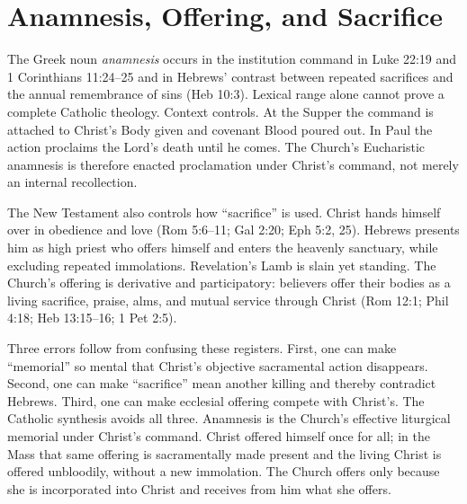 \section{Anamnesis, Offering, and Sacrifice}

The Greek noun \emph{anamnesis} occurs in the institution command in Luke
22:19 and 1 Corinthians 11:24--25 and in Hebrews' contrast between repeated
sacrifices and the annual remembrance of sins (Heb 10:3). Lexical range alone
cannot prove a complete Catholic theology. Context controls. At the Supper the
command is attached to Christ's Body given and covenant Blood poured out. In
Paul the action proclaims the Lord's death until he comes. The Church's
Eucharistic anamnesis is therefore enacted proclamation under Christ's command,
not merely an internal recollection.

The New Testament also controls how ``sacrifice'' is used. Christ hands himself
over in obedience and love (Rom 5:6--11; Gal 2:20; Eph 5:2, 25). Hebrews
presents him as high priest who offers himself and enters the heavenly
sanctuary, while excluding
repeated immolations. Revelation's Lamb is slain yet standing. The Church's
offering is derivative and participatory: believers offer their bodies as a
living sacrifice, praise, alms, and mutual service through Christ (Rom 12:1;
Phil 4:18; Heb 13:15--16; 1 Pet 2:5).

Three errors follow from confusing these registers. First, one can make
``memorial'' so mental that Christ's objective sacramental action disappears.
Second, one can make ``sacrifice'' mean another killing and thereby contradict
Hebrews. Third, one can make ecclesial offering compete with Christ's. The
Catholic synthesis avoids all three. Anamnesis is the Church's effective
liturgical memorial under Christ's command. Christ offered himself once for
all; in the Mass that same offering is sacramentally made present and the
living Christ is offered unbloodily, without a new immolation. The Church
offers only because she is incorporated into Christ and receives from him what
she offers.

